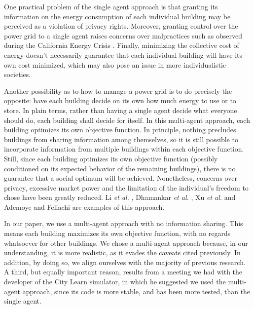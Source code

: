 \documentclass{article}
\begin{document}
One practical problem of the single agent approach is that granting its information on the energy consumption of each individual building may be perceived as a violation of privacy rights. Moreover, granting control over the power grid to a single agent raises concerns over malpractices such as observed during the California Energy Crisis \cite{California-Energy-Crisis}. Finally, minimizing the collective cost of energy doesn't necessarily guarantee that each individual building will have its own cost minimized, which may also pose an issue in more individualistic societies. 

Another possibility as to how to manage a power grid is to do precisely the opposite: have each building decide on its own how much energy to use or to store. In plain terms, rather than having a single agent decide what everyone should do, each building shall decide for itself. In this multi-agent approach, each building optimizes its own objective function. In principle, nothing precludes buildings from sharing information among themselves, so it is still possible to incorporate information from multiple buildings within each objective function. Still, since each building optimizes its own objective function (possibly conditioned on its expected behavior of the remaining buildings), there is no guarantee that a social optimum will be achieved. Nonetheless, concerns over privacy, excessive market power and the limitation of the individual's freedom to chose have been greatly reduced. Li \emph {et al.} \cite{Li2012}, Dhamankar \emph{et al.} \cite{Dhamankar2020}, Xu \emph{et al.} \cite{Xu2020} and Ademoye and Feliachi \cite{Ademoye2012} are examples of this approach.

In our paper, we use a multi-agent approach with no information sharing. This means each building maximizes its own objective function, with no regards whatsoever for other buildings. We chose a multi-agent approach because, in our understanding, it is more realistic, as it evades the caveats cited previously. In addition, by doing so, we align ourselves with the majority of previous research. A third, but equally important reason, results from a meeting we had with the developer of the City Learn simulator, in which he suggested we used the multi-agent approach, since its code is more stable, and has been more tested, than the single agent.
\end{document}
